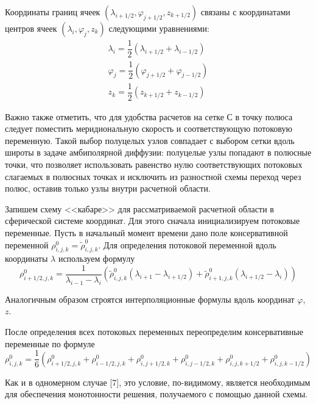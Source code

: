 \documentclass[14pt, a4paper]{extarticle}
\begin{document}
Координаты границ ячеек $(\lambda_{i+1/2}, \varphi_{j+1/2}, z_{k+1/2})$ связаны с координатами центров ячеек $(\lambda_i, \varphi_j, z_k)$ следующими уравнениями: \begin{gather}
\lambda_i = \dfrac{1}{2}(\lambda_{i+1/2}+\lambda_{i-1/2})\nonumber\\
\varphi_j = \dfrac{1}{2}(\varphi_{j+1/2}+\varphi_{j-1/2})\nonumber\\
z_k       = \dfrac{1}{2}(z_{k+1/2} + z_{k-1/2})\nonumber
\end{gather}

Важно также отметить, что для удобства расчетов на сетке С в точку полюса следует поместить меридиональную скорость и соответствующую потоковую переменную. Такой выбор полуцелых узлов совпадает с выбором сетки вдоль широты в задаче амбиполярной диффузии: полуцелые узлы попадают в полюсные точки, что позволяет использовать равенство нулю соответствующих потоковых слагаемых в полюсных точках и исключить из разностной схемы переход через полюс, оставив только узлы внутри расчетной области.

Запишем схему <<кабаре>> для рассматриваемой расчетной области в сферической системе координат. Для этого сначала инициализируем потоковые переменные. Пусть в начальный момент времени дано поле консервативной переменной $\rho_{i, j, k}^0 = \tilde{\rho}_{i, j, k}^0$. Для определения потоковой переменной  вдоль координаты $\lambda$ используем формулу
\begin{equation}
\rho_{i+1/2, j, k}^0 = \dfrac{1}{\lambda_{i-1}-\lambda_i}\left(\tilde{\rho}_{i,j,k}^0(\lambda_{i+1}-\lambda_{i+1/2}) + \tilde{\rho}_{i+1, j, k}^0(\lambda_{i+1/2}-\lambda_i)\right)
\end{equation}

Аналогичным образом строятся интерполяционные формулы вдоль координат $\varphi$, $z$.

После определения всех потоковых переменных переопределим консервативные переменные по формуле
\begin{equation}
\rho_{i, j, k}^0 = \dfrac{1}{6}(\rho_{i+1/2, j, k}^0 + \rho_{i-1/2, j, k}^0 + \rho_{i, j+1/2, k}^0 + \rho_{i, j-1/2, k}^0 + \rho_{i, j, k+1/2}^0+\rho_{i, j, k-1/2}^0)
\end{equation}

Как и в одномерном случае [7], это условие, по-видимому, является необходимым для обеспечения монотонности решения, получаемого с помощью данной схемы.
\end{document}
